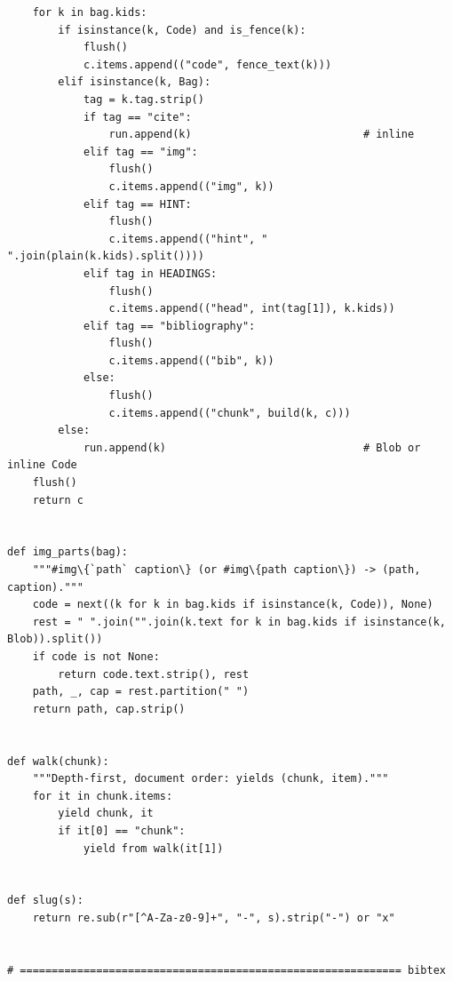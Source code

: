 \documentclass[10pt,a4paper]{article}
\newcounter{chunk}
\begin{document}
\begin{Verbatim}
    for k in bag.kids:
        if isinstance(k, Code) and is_fence(k):
            flush()
            c.items.append(("code", fence_text(k)))
        elif isinstance(k, Bag):
            tag = k.tag.strip()
            if tag == "cite":
                run.append(k)                           # inline
            elif tag == "img":
                flush()
                c.items.append(("img", k))
            elif tag == HINT:
                flush()
                c.items.append(("hint", " ".join(plain(k.kids).split())))
            elif tag in HEADINGS:
                flush()
                c.items.append(("head", int(tag[1]), k.kids))
            elif tag == "bibliography":
                flush()
                c.items.append(("bib", k))
            else:
                flush()
                c.items.append(("chunk", build(k, c)))
        else:
            run.append(k)                               # Blob or inline Code
    flush()
    return c


def img_parts(bag):
    """#img\{`path` caption\} (or #img\{path caption\}) -> (path, caption)."""
    code = next((k for k in bag.kids if isinstance(k, Code)), None)
    rest = " ".join("".join(k.text for k in bag.kids if isinstance(k, Blob)).split())
    if code is not None:
        return code.text.strip(), rest
    path, _, cap = rest.partition(" ")
    return path, cap.strip()


def walk(chunk):
    """Depth-first, document order: yields (chunk, item)."""
    for it in chunk.items:
        yield chunk, it
        if it[0] == "chunk":
            yield from walk(it[1])


def slug(s):
    return re.sub(r"[^A-Za-z0-9]+", "-", s).strip("-") or "x"


# ============================================================ bibtex
\end{Verbatim}
\end{document}
